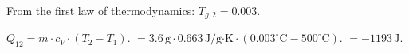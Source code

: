 From the first law of thermodynamics:  
\( T_{g,2} = 0.003 \).  

\( Q_{12} = m \cdot c_V \cdot (T_2 - T_1) \).  
\( = 3.6 \, \text{g} \cdot 0.663 \, \text{J/g·K} \cdot (0.003^\circ \text{C} - 500^\circ \text{C}) \).  
\( = -1193 \, \text{J} \).